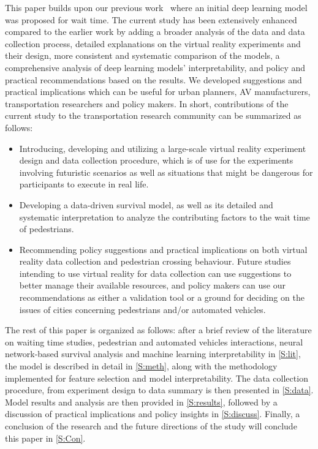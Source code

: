This paper builds upon our previous work~\citep{kalatian2019deepwait} where an initial deep learning model was proposed for wait time. The current study has been extensively enhanced compared to the earlier work by adding a broader analysis of the data and data collection process, detailed explanations on the virtual reality experiments and their design, more consistent and systematic comparison of the models, a comprehensive analysis of deep learning models' interpretability, and policy and practical recommendations based on the results. We developed suggestions and practical implications which can be useful for urban planners, AV manufacturers, transportation researchers and policy makers. In short, contributions of the current study to the transportation research community can be summarized as follows:
\begin{itemize}
    \item Introducing, developing and utilizing a large-scale virtual reality experiment design and data collection procedure, which is of use for the experiments involving futuristic scenarios as well as situations that might be dangerous for participants to execute in real life.
    \item Developing a data-driven survival model, as well as its detailed and systematic interpretation to analyze the contributing factors to the wait time of pedestrians.
    \item Recommending policy suggestions and practical implications on both virtual reality data collection and pedestrian crossing behaviour. Future studies intending to use virtual reality for data collection can use suggestions to better manage their available resources, and policy makers can use our recommendations as either a validation tool or a ground for deciding on the issues of cities concerning pedestrians and/or automated vehicles.
\end{itemize} 

The rest of this paper is organized as follows: after a brief review of the literature on waiting time studies, pedestrian and automated vehicles interactions, neural network-based survival analysis and machine learning interpretability in \cref{S:lit}, the model is described in detail in \cref{S:meth}, along with the methodology implemented for feature selection and model interpretability. The data collection procedure, from experiment design to data summary is then presented in \cref{S:data}. Model results and analysis are then provided in \cref{S:results}, followed by a discussion of practical implications and policy insights in \cref{S:discuss}. Finally, a conclusion of the research and the future directions of the study will conclude this paper in \cref{S:Con}. 
